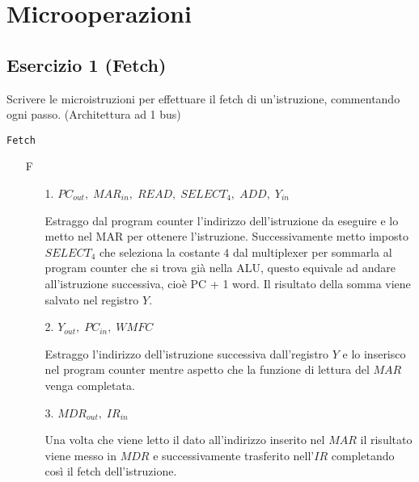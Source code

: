 \documentclass[a4paper]{article}
\theoremstyle{break}
\theoremstyle{break}
\theoremstyle{break}
\theoremstyle{break}
\begin{document}
\tableofcontents
\pagebreak

\section{Microoperazioni}
\subsection{Esercizio 1 (Fetch)}
\begin{exercise}
Scrivere le microistruzioni per effettuare il fetch di un'istruzione, commentando ogni 
passo. (Architettura ad 1 bus)
  \begin{center}
    \texttt{Fetch}
  \end{center}

  \begin{enumerate}
    \item [F]
      \begin{enumerate}
        \item[1.] \( PC_{out},\; MAR_{in},\; READ,\; SELECT_4,\; ADD,\; Y_{in} \) 

          \noindent Estraggo dal program counter l'indirizzo dell'istruzione da eseguire e
          lo metto nel MAR per ottenere l'istruzione. Successivamente metto imposto
          \( SELECT_4 \) che seleziona la costante \( 4 \) dal multiplexer per sommarla
          al program counter che si trova già nella ALU, questo equivale ad andare 
          all'istruzione successiva, cioè PC + 1 word. Il risultato della somma
          viene salvato nel registro \( Y \).

        \item[2.] \( Y_{out},\; PC_{in},\; WMFC \) 

          \noindent Estraggo l'indirizzo dell'istruzione successiva dall'registro \( Y \) 
          e lo inserisco nel program counter mentre aspetto che la funzione di lettura
          del \( MAR \) venga completata.

        \item[3.] \( MDR_{out},\; IR_{in} \) 

          \noindent Una volta che viene letto il dato all'indirizzo inserito nel \( MAR \)
          il risultato viene messo in \( MDR \) e successivamente trasferito nell'\( IR \)
          completando così il fetch dell'istruzione.
      \end{enumerate}
  \end{enumerate}
\end{exercise}
\end{document}
